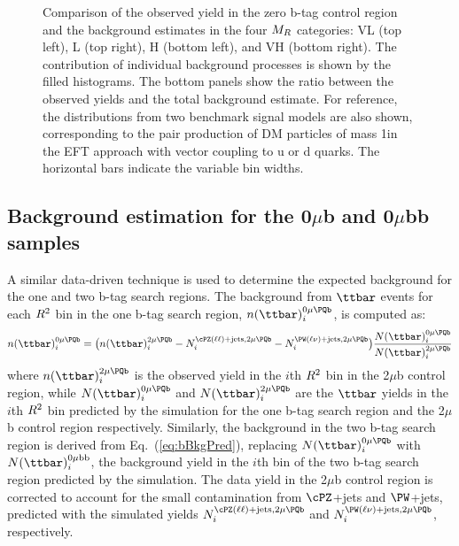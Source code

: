 \begin{figure}
 \caption{Comparison of the observed yield in the zero b-tag control region and the
   background estimates in the four $M_R$ categories:
   VL (top left), L (top right), H (bottom left), and VH (bottom right). The
   contribution of individual background processes is shown by the
   filled histograms. The bottom panels show the ratio
   between the observed yields and the total background estimate. For reference, the distributions from two
   benchmark signal models are also shown, corresponding to the pair
   production of DM particles of mass 1\GeV in the EFT approach with
   vector coupling to u or d quarks. The horizontal bars indicate
the variable bin widths.\label{fig:0muSignalBkg1GeV} }
\end{figure}


\subsection{Background estimation for the \texorpdfstring{0$\mu$b and 0$\mu$bb}{0 mu b and 0 mu bb} samples}

A similar data-driven technique is used to determine the expected background for the 
one and two b-tag search regions. The background from $\ttbar$ events for each $R^2$ bin in the
one b-tag search region, $n(\ttbar)_{i}^{0\mu\PQb}$, is computed as:
\begin{equation}
  n(\ttbar)_{i}^{0\mu\PQb} =  \bigl(n(\ttbar)_{i}^{2\mu\PQb} - N_{i}^{\cPZ(\ell
    \ell)+\text{jets},2\mu\PQb} - N_{i}^{\PW(\ell\nu)+\text{jets},2\mu\PQb}\bigr)
\frac{N(\ttbar)_{i}^{0\mu\PQb}}{N(\ttbar)_{i}^{2\mu\PQb}}\label{eq:bBkgPred}
\end{equation}
where $n(\ttbar)_{i}^{2\mu\PQb}$ is the observed yield in the $i$th $R^2$
bin in the 2$\mu$b control region, while $N(\ttbar)_{i}^{0\mu\PQb}$ and
$N(\ttbar)_{i}^{2\mu\PQb}$ are the $\ttbar$ yields in the $i$th $R^2$ bin 
predicted by the simulation for the one b-tag search region and the 2$\mu$b control region
respectively. Similarly, the \ttbar background in the two b-tag search region
is derived from Eq.~(\ref{eq:bBkgPred}), replacing $N(\ttbar)_{i}^{0\mu\PQb}$ 
with $N(\ttbar)_{i}^{0\mu\mathrm{bb}}$, the \ttbar
background yield in the $i$th bin of the two b-tag search region predicted
by the simulation. The data yield in the 2$\mu$b control region is
corrected to account for the small contamination from $\cPZ$+jets and
$\PW$+jets, predicted with the simulated yields $N_{i}^{\cPZ(\ell\ell)+\text{jets},2\mu\PQb}$ and
$N_{i}^{\PW(\ell\nu)+\text{jets},2\mu\PQb}$, respectively.


